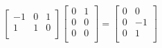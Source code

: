 \documentclass[11pt,a4paper]{report}
\begin{document}
\begin{Ex}
\begin{align*}
\begin{bmatrix}
                                -1 & 0 & 1 \\
                                1 & 1 & 0 \\ \end{bmatrix} \begin{bmatrix} 0 & 1 \\ 0 & 0 \\ 0 & 0 \\ \end{bmatrix} = \begin{bmatrix} 0 & 0 \\
                            0 & -1 \\
                            0 & 1 \\ \end{bmatrix} 
            \end{align*}
         

\end{Ex}
\end{document}
